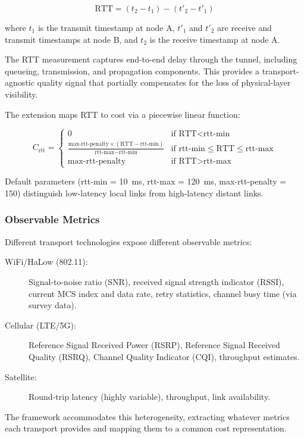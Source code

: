 \[
\text{RTT} = (t_2 - t_1) - (t'_2 - t'_1)
\]

where $t_1$ is the transmit timestamp at node A, $t'_1$ and $t'_2$ are receive and transmit timestamps at node B, and $t_2$ is the receive timestamp at node A.

The RTT measurement captures end-to-end delay through the tunnel, including queueing, transmission, and propagation components. This provides a transport-agnostic quality signal that partially compensates for the loss of physical-layer visibility.

The extension maps RTT to cost via a piecewise linear function:

\[
C_{\text{rtt}} = \begin{cases}
0 & \text{if } \text{RTT} < \text{rtt-min} \\
\frac{\text{max-rtt-penalty} \times (\text{RTT} - \text{rtt-min})}{\text{rtt-max} - \text{rtt-min}} & \text{if } \text{rtt-min} \leq \text{RTT} \leq \text{rtt-max} \\
\text{max-rtt-penalty} & \text{if } \text{RTT} > \text{rtt-max}
\end{cases}
\]

Default parameters (rtt-min = 10~ms, rtt-max = 120~ms, max-rtt-penalty = 150) distinguish low-latency local links from high-latency distant links.

\subsubsection{Observable Metrics}

Different transport technologies expose different observable metrics:

\begin{description}
    \item[WiFi/HaLow (802.11):] Signal-to-noise ratio (SNR), received signal strength indicator (RSSI), current MCS index and data rate, retry statistics, channel busy time (via survey data).
    \item[Cellular (LTE/5G):] Reference Signal Received Power (RSRP), Reference Signal Received Quality (RSRQ), Channel Quality Indicator (CQI), throughput estimates.
    \item[Satellite:] Round-trip latency (highly variable), throughput, link availability.
\end{description}

The framework accommodates this heterogeneity, extracting whatever metrics each transport provides and mapping them to a common cost representation.

